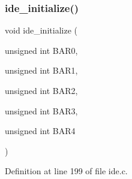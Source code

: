 \mbox{\label{a00026_ab5397c8432be802172da8f04c8840ca3_ab5397c8432be802172da8f04c8840ca3}} 
\subsubsection{\texorpdfstring{ide\+\_\+initialize()}{ide\_initialize()}}
{\footnotesize\ttfamily void ide\+\_\+initialize (\begin{DoxyParamCaption}\item[{unsigned int}]{B\+A\+R0,  }\item[{unsigned int}]{B\+A\+R1,  }\item[{unsigned int}]{B\+A\+R2,  }\item[{unsigned int}]{B\+A\+R3,  }\item[{unsigned int}]{B\+A\+R4 }\end{DoxyParamCaption})}



Definition at line 199 of file ide.\+c.


